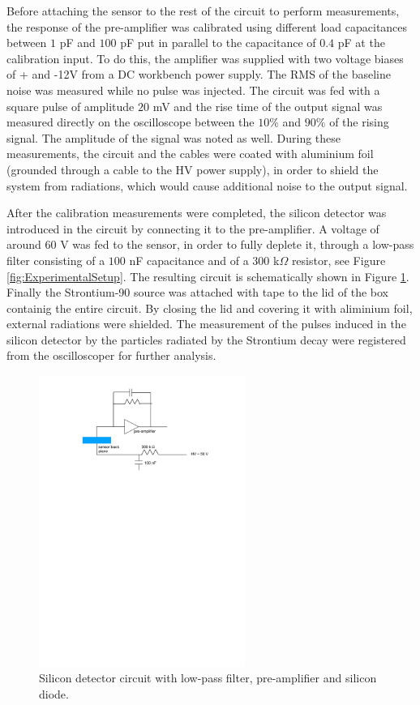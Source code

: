 \documentclass[12pt]{article}
\begin{document}
Before attaching the sensor to the rest of the circuit to perform measurements, the response of the pre-amplifier was calibrated using different load capacitances between $1$ pF and $100$ pF put in parallel to the capacitance of $0.4$ pF at the calibration input. To do this, the amplifier was supplied with two voltage biases of + and -12V from a DC workbench power supply. The RMS of the baseline noise was measured while no pulse was injected. The circuit was fed with a square pulse of amplitude $20$ mV and the rise time of the output signal was measured directly on the oscilloscope between the $10\%$ and $90\%$ of the rising signal. The amplitude of the signal was noted as well. During these measurements, the circuit and the cables were coated with aluminium foil (grounded through a cable to the HV power supply), in order to shield the system from radiations, which would cause additional noise to the output signal.

After the calibration measurements were completed, the silicon detector was introduced in the circuit by connecting it to the pre-amplifier. A voltage of around $60$ V was fed to the sensor, in order to fully deplete it, through a low-pass filter consisting of a $100$ nF capacitance and of a $300$ k$\Omega$ resistor, see Figure \ref{fig:ExperimentalSetup}. The resulting circuit is schematically shown in Figure \ref{fig:SiliconDiodeCircuit}.
Finally the Strontium-90 source was attached with tape to the lid of the box containig the entire circuit. By closing the lid and covering it with aliminium foil, external radiations were shielded. The measurement of the pulses induced in the silicon detector by the particles radiated by the Strontium decay were registered from the oscilloscoper for further analysis.

\begin{figure}[htb]
  \centering
  \includegraphics[width=0.6\textwidth]{./graphics/SiliconDiodeCircuit}
  \caption{Silicon detector circuit with low-pass filter, pre-amplifier and silicon diode.}
  \label{fig:SiliconDiodeCircuit}
\end{figure}
\end{document}
